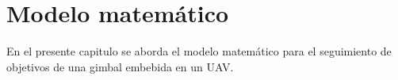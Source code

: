 \chapter{Modelo matemático}

En el presente capitulo se aborda el modelo matemático para el seguimiento de objetivos de una gimbal embebida en un UAV.

